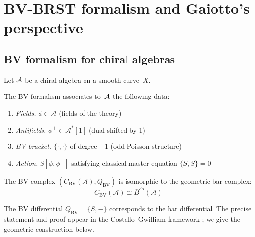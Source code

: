 \chapter{BV-BRST formalism and Gaiotto's perspective}
\label{ch:bv-brst}

\label{rem:programme-bv}

\section{BV formalism for chiral algebras}

Let $\mathcal{A}$ be a chiral algebra on a smooth curve~$X$.

\begin{definition}
The BV formalism associates to~$\mathcal{A}$ the following data:
\begin{enumerate}
\item \emph{Fields.} $\phi \in \mathcal{A}$ (fields of the theory)
\item \emph{Antifields.} $\phi^+ \in \mathcal{A}^*[1]$ (dual shifted by 1)
\item \emph{BV bracket.} $\{\cdot, \cdot\}$ of degree $+1$ (odd Poisson structure)
\item \emph{Action.} $S[\phi, \phi^+]$ satisfying classical master equation
$\{S, S\} = 0$
\end{enumerate}
\end{definition}

\begin{theorem}[BV complex = geometric bar complex; \ClaimStatusProvedElsewhere]
\label{thm:bv-bar-geometric}
The BV complex $(C_{\text{BV}}(\mathcal{A}), Q_{\text{BV}})$ is isomorphic to
the geometric bar complex:
\[C_{\text{BV}}(\mathcal{A}) \cong \bar{B}^{\text{ch}}(\mathcal{A})\]

The BV differential $Q_{\text{BV}} = \{S, -\}$ corresponds to the bar differential.
The precise statement and proof appear in the Costello--Gwilliam framework \cite{CG17}; we give the geometric construction below.
\end{theorem}

